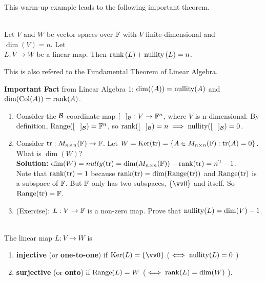 \begin{remark}
    This warm-up example leads to the following important theorem.
\end{remark}

\begin{theorem}
    \phantom{}\\
    Let $V$ and $W$ be vector spaces over ${\mathbb{F}}$ with $V$ finite-dimensional and $\dim{(V)} = n$.
    Let \\ $L:V\to W$ be a linear map. Then $\operatorname{rank}{(L)}+\operatorname{nullity}{(L)} = n$.
\end{theorem}

\begin{remark}
    This is also refered to the Fundamental Theorem of Linear Algebra.
\end{remark}

\textbf{Important Fact} from Linear Algebra 1: $\dim(\null(A)) = \nully(A)$ and $\dim(\operatorname{Col}(A)) = \operatorname{rank}(A)$.

\begin{example}
    \phantom{}
    \begin{enumerate}
        \item Consider the $\mathcal{B}$-coordinate map $[\phantom{A}]_{\mathcal{B}}:V \to {\mathbb{F}}^n$, where $V$ is n-dimensional.
        By definition, $\operatorname{Range}([\phantom{A}]_{\mathcal{B}}) = {\mathbb{F}}^n$, so $\operatorname{rank}([\phantom{A}]_{\mathcal{B}}) = n \implies \operatorname{nullity}([\phantom{A}]_{\mathcal{B}}) = 0$.
        \item Consider $\operatorname{tr}:M_{n \times n}({\mathbb{F}}) \to {\mathbb{F}}$. Let $W = \operatorname{Ker}(\operatorname{tr}) = \left\{ A \in M_{n \times n}({\mathbb{F}}): \operatorname{tr}(A) = 0 \right\}$.
        What is $\dim(W)$? \\
        \textbf{Solution:} $\dim(W) = nully(\operatorname{tr}) = \dim(M_{n \times n}({\mathbb{F}})) - \operatorname{rank}(\operatorname{tr}) = n^2 - 1$. \\
        Note that $\operatorname{rank}(\operatorname{tr}) = 1$ because $\operatorname{rank}(\operatorname{tr}) = \dim(\operatorname{Range}(\operatorname{tr}))$ and $\operatorname{Range}(\operatorname{tr})$ is a subspace of ${\mathbb{F}}$.
        But ${\mathbb{F}}$ only has two subspaces, $\{\vzero\}$ and itself. So $\operatorname{Range}(\operatorname{tr}) = {\mathbb{F}}$.
        \item (Exercise): $L:V \to {\mathbb{F}}$ is a non-zero map. Prove that $\operatorname{nullity}(L) = \dim(V) - 1$.
    \end{enumerate}
\end{example}

\begin{definition}
    \phantom{}\\
    The linear map $L:V \to W$ is
    \begin{enumerate}[label=(\alph*)]
        \item \textbf{injective} (or \textbf{one-to-one}) if $\ker(L) = \{\vzero\}$ ($\iff \operatorname{nullity}(L) = 0$ )
        \item \textbf{surjective} (or \textbf{onto}) if $\operatorname{Range}(L) = W$ ($\iff \operatorname{rank}(L) = \dim(W)$ ).
    \end{enumerate}
\end{definition}

